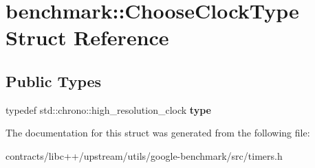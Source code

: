 \hypertarget{structbenchmark_1_1_choose_clock_type}{}\section{benchmark\+:\+:Choose\+Clock\+Type Struct Reference}
\label{structbenchmark_1_1_choose_clock_type}
\subsection*{Public Types}
\begin{DoxyCompactItemize}
\item 
\mbox{\label{structbenchmark_1_1_choose_clock_type_a1f16d9f54b1776d1c648b93489b64b0c}} 
typedef std\+::chrono\+::high\+\_\+resolution\+\_\+clock {\bfseries type}
\end{DoxyCompactItemize}


The documentation for this struct was generated from the following file\+:\begin{DoxyCompactItemize}
\item 
contracts/libc++/upstream/utils/google-\/benchmark/src/timers.\+h\end{DoxyCompactItemize}
